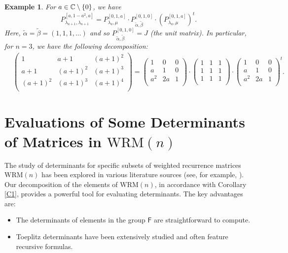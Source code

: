 \documentclass{amsart}
\newtheorem{ex}{Example}
\begin{document}
\begin{ex} {\rm  For $a\in {\Bbb C}\setminus \{0\}$, we have 
$$P_{\lambda_{a+1}, \lambda_{a+1}}^{[a, 1-a^2, a]}=P_{\lambda_a, \mu}^{[0, 1, a]}\cdot  P_{\widetilde{\alpha}, \widetilde{\beta}}^{[0, 1, 0]} \cdot (P_{\lambda_a, \mu}^{[0, 1, a]})^t.$$
Here, $\widetilde{\alpha}=\widetilde{\beta}=(1, 1, 1, \ldots)$ and so $P_{\widetilde{\alpha}, \widetilde{\beta}}^{[0, 1, 0]}=J$ (the unit matrix).
In particular, for $n=3$, we have the following decomposition:
\begin{align*}
&\begin{pmatrix}
1 & a+1 & (a+1)^2\\
a+1 & (a+1)^2 & (a+1)^3 \\
(a+1)^2 & (a+1)^3 & (a+1)^4\\
\end{pmatrix}=
\begin{pmatrix}
1 & 0 & 0 \\
a & 1 & 0 \\
a^2 &2a & 1 \\
\end{pmatrix}
\cdot
\begin{pmatrix}
1 & 1 & 1  \\
1 & 1 & 1  \\
1 & 1 & 1 \\
\end{pmatrix}
\cdot
\begin{pmatrix}
1 & 0 & 0 \\
a & 1 & 0 \\
a^2 & 2a & 1  \\
\end{pmatrix}^t.
\end{align*}}
\end{ex}



\section{Evaluations of Some Determinants of Matrices in $\mathrm{WRM}(n)$} The study of determinants for specific subsets of weighted recurrence matrices $\mathrm{WRM}(n)$ has been explored in various literature sources (see, for example, \cite{Bach, K2, MSS1}). Our decomposition of the elements of $\mathrm{WRM}(n)$, in accordance with Corollary \ref{C1}, provides a powerful tool for evaluating determinants. The key advantages are:
\begin{itemize}
\item[-] The determinants of elements in the group $\mathsf{F}$ are straightforward to compute.
\item[-]  Toeplitz determinants have been extensively studied and often feature recursive formulas. 
\end{itemize}
\end{document}
